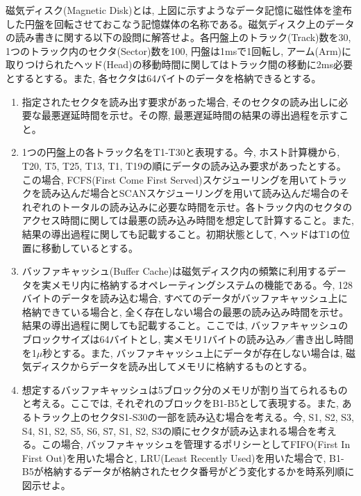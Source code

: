 \documentclass[dvipdfmx,titlepage, 11pt, a4paper]{jsarticle}%
\begin{document}
\noindent 磁気ディスク(Magnetic Disk)とは, 上図に示すようなデータ記憶に磁性体を塗布した円盤を回転させておこなう記憶媒体の名称である。磁気ディスク上のデータの読み書きに関する以下の設問に解答せよ。各円盤上のトラック(Track)数を30, 1つのトラック内のセクタ(Sector)数を100, 円盤は1msで1回転し, アーム(Arm)に取りつけられたヘッド(Head)の移動時間に関してはトラック間の移動に2ms必要とするとする。また, 各セクタは64バイトのデータを格納できるとする。
\begin{enumerate}[(1)]
  \setlength{\itemsep}{15pt}
\item 指定されたセクタを読み出す要求があった場合, そのセクタの読み出しに必要な最悪遅延時間を示せ。その際, 最悪遅延時間の結果の導出過程を示すこと。
\item 1つの円盤上の各トラック名をT1-T30と表現する。今, ホスト計算機から, T20, T5, T25, T13, T1, T19の順にデータの読み込み要求があったとする。この場合, FCFS(First Come First Served)スケジューリングを用いてトラックを読み込んだ場合とSCANスケジューリングを用いて読み込んだ場合のそれぞれのトータルの読み込みに必要な時間を示せ。各トラック内のセクタのアクセス時間に関しては最悪の読み込み時間を想定して計算すること。また, 結果の導出過程に関しても記載すること。初期状態として, ヘッドはT1の位置に移動しているとする。
\item バッファキャッシュ(Buffer Cache)は磁気ディスク内の頻繁に利用するデータを実メモリ内に格納するオペレーティングシステムの機能である。今, 128バイトのデータを読み込む場合, すべてのデータがバッファキャッシュ上に格納できている場合と, 全く存在しない場合の最悪の読み込み時間を示せ。結果の導出過程に関しても記載すること。ここでは, バッファキャッシュのブロックサイズは64バイトとし, 実メモリ1バイトの読み込み／書き出し時間を1$\mu$秒とする。また, バッファキャッシュ上にデータが存在しない場合は, 磁気ディスクからデータを読み出してメモリに格納するものとする。
\item 想定するバッファキャッシュは5ブロック分のメモリが割り当てられるものと考える。ここでは, それぞれのブロックをB1-B5として表現する。また, あるトラック上のセクタS1-S30の一部を読み込む場合を考える。今, S1, S2, S3, S4, S1, S2, S5, S6, S7, S1, S2, S3の順にセクタが読み込まれる場合を考える。この場合, バッファキャッシュを管理するポリシーとしてFIFO(First In First Out)を用いた場合と, LRU(Least Recently Used)を用いた場合で, B1-B5が格納するデータが格納されたセクタ番号がどう変化するかを時系列順に図示せよ。
\end{enumerate}
\end{document}
